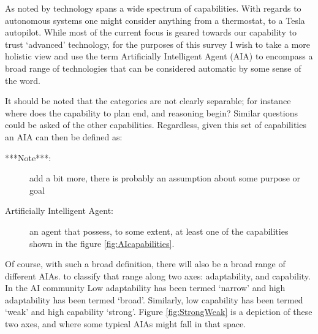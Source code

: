     As noted by \cite{Tripp2011-cq} technology spans a wide spectrum of capabilities. With regards to autonomous systems one might consider anything from a thermostat, to a Tesla autopilot. While most of the current focus is geared towards our capability to trust `advanced' technology, for the purposes of this survey I wish to take a more holistic view and use the term Artificially Intelligent Agent (AIA) to encompass a broad range of technologies that can be considered automatic by some sense of the word. 

    It should be noted that the categories are not clearly separable; for instance where does the capability to plan end, and reasoning begin? Similar questions could be asked of the other capabilities. Regardless, given this set of capabilities an AIA can then be defined as:
    
    \begin{description}
    	\item [***Note***:] add a bit more, there is probably an assumption about some purpose or goal
        \item[Artificially Intelligent Agent:] an agent that possess, to some extent, at least one of the capabilities shown in the figure \ref{fig:AIcapabilities}. 
    \end{description}

    Of course, with such a broad definition, there will also be a broad range of different AIAs.  to classify that range along two axes: adaptability, and capability.  In the AI community Low adaptability has been termed `narrow' and high adaptability has been termed `broad'. Similarly, low capability has been termed `weak' and high capability `strong'. Figure \ref{fig:StrongWeak} is a depiction of these two axes, and where some typical AIAs might fall in that space.

